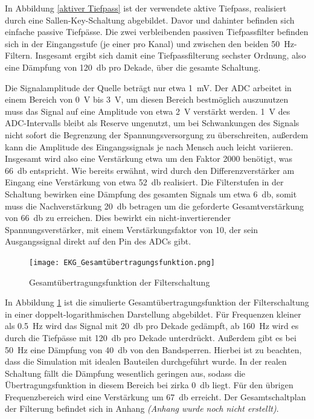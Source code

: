 In Abbildung \ref{aktiver Tiefpass} ist der verwendete aktive Tiefpass, realisiert durch eine Sallen-Key-Schaltung abgebildet. Davor und dahinter befinden sich einfache passive Tiefpässe. Die zwei verbleibenden passiven Tiefpassfilter befinden sich in der Eingangsstufe (je einer pro Kanal) und zwischen den beiden \SI{50}{\hertz}-Filtern. Insgesamt ergibt sich damit eine Tiefpassfilterung sechster Ordnung, also eine Dämpfung von \SI{120}{\decibel} pro Dekade, über die gesamte Schaltung. 

Die Signalamplitude der Quelle beträgt nur etwa \SI{1}{\milli\volt}. Der ADC arbeitet in einem Bereich von \SI{0}{\volt} bis \SI{3}{\volt}, um diesen Bereich bestmöglich auszunutzen muss das Signal auf eine Amplitude von etwa \SI{2}{\volt} verstärkt werden. \SI{1}{\volt} des ADC-Intervalls bleibt als Reserve ungenutzt, um bei Schwankungen des Signals nicht sofort die Begrenzung der Spannungsversorgung zu überschreiten, außerdem kann die Amplitude des Eingangssignals je nach Mensch auch leicht variieren. Insgesamt wird also eine Verstärkung etwa um den Faktor 2000 benötigt, was \SI{66}{\decibel} entspricht. Wie bereits erwähnt, wird durch den Differenzverstärker am Eingang eine Verstärkung von etwa \SI{52}{\decibel} realisiert. Die Filterstufen in der Schaltung bewirken eine Dämpfung des gesamten Signals um etwa \SI{6}{\decibel}, somit muss die Nachverstärkung \SI{20}{\decibel} betragen um die geforderte Gesamtverstärkung von \SI{66}{\decibel} zu erreichen. Dies bewirkt ein nicht-invertierender Spannungsverstärker, mit einem Verstärkungsfaktor von 10, der sein Ausgangssignal direkt auf den Pin des ADCs gibt.

\begin{figure} [!h]
	\texttt{[image: EKG\_Gesamtübertragungsfunktion.png]}
	\caption{Gesamtübertragungsfunktion der Filterschaltung}
	\label{Bodediagramm Filterschaltung} 
\end{figure}

In Abbildung \ref{Bodediagramm Filterschaltung} ist die simulierte Gesamtübertragungsfunktion der Filterschaltung in einer doppelt-logarithmischen Darstellung abgebildet. Für Frequenzen kleiner als \SI{0,5}{\hertz} wird das Signal mit \SI{20}{\decibel} pro Dekade gedämpft, ab \SI{160}{\hertz} wird es durch die Tiefpässe mit \SI{120}{\decibel} pro Dekade unterdrückt. Außerdem gibt es bei \SI{50}{\hertz} eine Dämpfung von \SI{40}{\decibel} von den Bandsperren. Hierbei ist zu beachten, dass die Simulation mit idealen Bauteilen durchgeführt wurde. In der realen Schaltung fällt die Dämpfung wesentlich geringen aus, sodass die Übertragungsfunktion in diesem Bereich bei zirka \SI{0}{\decibel} liegt. Für den übrigen Frequenzbereich wird eine Verstärkung um \SI{67}{\decibel} erreicht. Der Gesamtschaltplan der Filterung befindet sich in Anhang \textit{(Anhang wurde noch nicht erstellt)}. 


